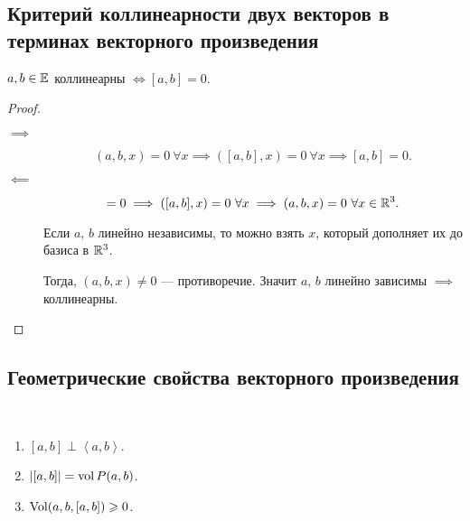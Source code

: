 \subsection{Критерий коллинеарности двух векторов в терминах векторного произведения}

\begin{proposal}
    $a, b \in \mathbb{E}$ коллинеарны $\iff [a, b] = 0$.
\end{proposal}

\begin{proof}~
    \begin{description}
        \item[$\implies$] 
            \begin{equation*}
                (a, b, x) = 0 \ \forall x \implies ([a, b], x) = 0 \ \forall x \implies [a, b] = 0
            .\end{equation*}

        \item[$\impliedby$]
            \begin{equation*}
                [a, b] = 0 \implies ([a, b], x) = 0 \ \forall x \implies (a, b, x) = 0 \ \forall x \in \RR^3
            .\end{equation*}

            Если $a$, $b$ линейно независимы, то можно взять $x$, который дополняет их до базиса в $\mathbb{R}^3$.

            Тогда, $(a, b, x) \neq 0$ --- противоречие. Значит $a$, $b$ линейно зависимы $\implies$ коллинеарны.
            \qedhere
    \end{description}
\end{proof}


\subsection{Геометрические свойства векторного произведения}

\begin{proposal}~
    \begin{enumerate}[nosep]
    \item $[a, b] \perp \left< a, b \right>$.
    \item $\left|[a, b]\right| = \operatorname{\mathop{\mathrm{vol}}} P(a, b)$.
    \item $\operatorname{\mathop{\mathrm{Vol}}}(a, b, [a, b]) \geqslant 0$.
    \end{enumerate}
\end{proposal}

